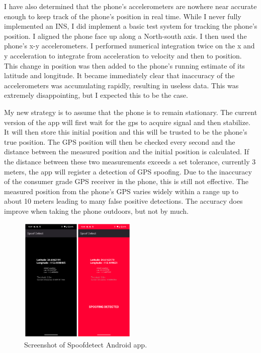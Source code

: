 \documentclass[conference]{IEEEtran}
\begin{document}
I have also determined that the phone’s accelerometers are nowhere near accurate enough to keep track of the phone’s position in real time.  While I never fully implemented an INS, I did implement a basic test system for tracking the phone’s position.  I aligned the phone face up along a North-south axis.  I then used the phone’s x-y accelerometers.  I performed numerical integration twice on the x and y acceleration to integrate from acceleration to velocity and then to position.  This change in position was then added to the phone's running estimate of its latitude and longitude.  It became immediately clear that inaccuracy of the accelerometers was accumulating rapidly, resulting in useless data. This was extremely disappointing, but I expected this to be the case.

My new strategy is to assume that the phone is to remain stationary.  The current version of the app will first wait for the gps to acquire signal and then stabilize.  It will then store this initial position and this will be trusted to be the phone's true position.  The GPS position will then be checked every second and the distance between the measured position and the initial position is calculated.  If the distance between these two measurements exceeds a set tolerance, currently 3 meters, the app will register a detection of GPS spoofing.  Due to the inaccuracy of the consumer grade GPS receiver in the phone, this is still not effective.  The measured position from the phone’s GPS varies widely within a range up to about 10 meters leading to many false positive detections.  The accuracy does improve when taking the phone outdoors, but not by much.

\begin{figure}[htbp]
    \centerline{\includegraphics[width=0.5\textwidth]{figs/spoofdetect_app.png}}
    \caption{Screenshot of Spoofdetect Android app.}
\end{figure}
\end{document}
